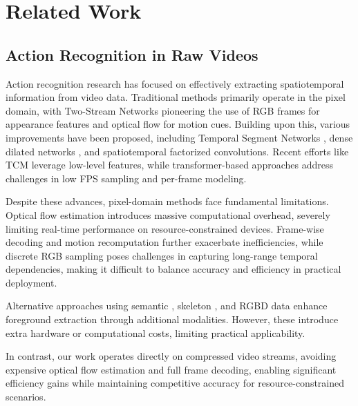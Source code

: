 \documentclass[runningheads]{llncs}
\begin{document}
\section{Related Work}
\label{sec:related_work}
\subsection{Action Recognition in Raw Videos}
Action recognition research has focused on effectively extracting spatiotemporal information from video data. Traditional methods primarily operate in the pixel domain, with Two-Stream Networks \cite{simonyan2014two} pioneering the use of RGB frames for appearance features and optical flow for motion cues. Building upon this, various improvements have been proposed, including Temporal Segment Networks \cite{wang2016temporal}, dense dilated networks \cite{xu2019dense}, and spatiotemporal factorized convolutions. Recent efforts like TCM \cite{liu2022motion} leverage low-level features, while transformer-based approaches \cite{piergiovanni2023rethinking} address challenges in low FPS sampling and per-frame modeling.

Despite these advances, pixel-domain methods face fundamental limitations. Optical flow estimation introduces massive computational overhead, severely limiting real-time performance on resource-constrained devices. Frame-wise decoding and motion recomputation further exacerbate inefficiencies, while discrete RGB sampling poses challenges in capturing long-range temporal dependencies, making it difficult to balance accuracy and efficiency in practical deployment.

Alternative approaches using semantic \cite{tu2019semantic,shen2022fexnet,luo2022dense}, skeleton \cite{tu2022joint,xiong2023human,liu2023novel,shu2023multi,xu2023spatiotemporal,xu2023pyramid}, and RGBD data \cite{cheng2022cross} enhance foreground extraction through additional modalities. However, these introduce extra hardware or computational costs, limiting practical applicability.

In contrast, our work operates directly on compressed video streams, avoiding expensive optical flow estimation and full frame decoding, enabling significant efficiency gains while maintaining competitive accuracy for resource-constrained scenarios.
\end{document}
